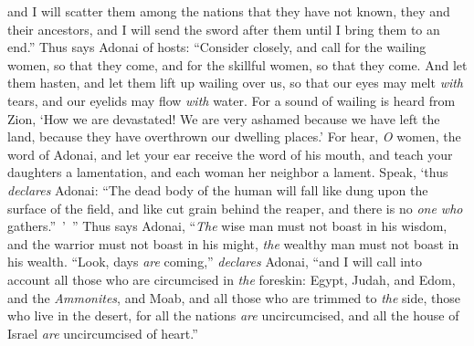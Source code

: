 \begin{biblechapter}
\verse and I will scatter them among the nations that they have not known, they and their ancestors, and I will send the sword after them until I bring them to an end.”
\verse Thus says Adonai of hosts:
\verse “Consider closely, and call for the wailing women, so that they come, 
and for the skillful women, so that they come.
\verse And let them hasten, 
and let them lift up wailing over us, 
so that our eyes may melt \textit{with} tears, 
and our eyelids may flow \textit{with} water.
\verse For a sound of wailing is heard from Zion, 
‘How we are devastated! 
We are very ashamed because we have left the land, 
because they have overthrown our dwelling places.’
\verse For hear, \textit{O} women, the word of Adonai, 
and let your ear receive the word of his mouth, 
and teach your daughters a lamentation, 
and each woman her neighbor a lament.
\verse Speak, ‘thus \textit{declares} Adonai: “The dead body of the human will fall 
like dung upon the surface of the field, 
and like cut grain behind the reaper, 
and there is no \textit{one who} gathers.” ’ ”
 Thus says Adonai,
\verse “\textit{The} wise man must not boast in his wisdom, 
and the warrior must not boast in his might, 
\textit{the} wealthy man must not boast in his wealth.
 “Look, days \textit{are} coming,” \textit{declares} Adonai, “and I will call into account all those who are circumcised in \textit{the} foreskin:
\verse Egypt, Judah, and Edom, and the \textit{Ammonites}, and Moab, and all those who are trimmed to \textit{the} side, those who live in the desert, for all the nations \textit{are} uncircumcised, and all the house of Israel \textit{are} uncircumcised of heart.”
\end{biblechapter}

